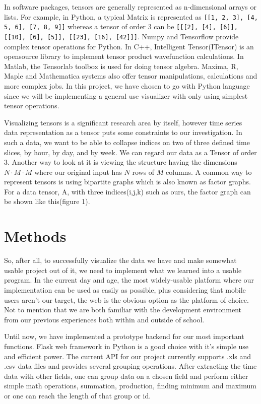 \documentclass[11pt]{article}
\begin{document}
In software packages, tensors are generally represented as n-dimensional arrays or lists. For example, in Python, a typical Matrix is represented as \texttt{[[1, 2, 3], [4, 5, 6], [7, 8, 9]]} whereas a tensor of order 3 can be \texttt{[[[2], [4], [6]], [[10], [6], [5]], [[23], [16], [42]]]}. Numpy and Tensorflow provide complex tensor operations for Python. In C++, Intelligent Tensor(ITensor) is an opensource library to implement tensor product wavefunction calculations\cite{itensor}. In Matlab, the Tensorlab toolbox is used for doing tensor algebra. Maxima, R, Maple and Mathematica systems also offer tensor manipulations, calculations and more complex jobs\cite{kolda}. In this project, we have chosen to go with Python language since we will be implementing a general use visualizer with only using simplest tensor operations.

Visualizing tensors is a significant research area by itself, however time series data representation as a tensor puts some constraints to our investigation. In such a data, we want to be able to collapse indices on two of three defined time slices, by hour, by day, and by week. We can regard our data as a Tensor of order 3. Another way to look at it is viewing the structure having the dimensions $N \cdot M \cdot M$ where our original input has $N$ rows of $M$ columns. A common way to represent tensors is using bipartite graphs which is also known as factor graphs. For a data tensor, A, with three indices(i,j,k) such as ours, the factor graph can be shown like this(figure 1).

\noindent{}

\section{Methods}

So, after all, to successfully visualize the data we have and make somewhat usable project out of it, we need to implement what we learned into a usable program. In the current day and age, the most widely-usable platform where our implementation can be used as easily as possible, plus considering that mobile users aren't our target, the web is the obvious option as the platform of choice. Not to mention that we are both familiar with the development environment from our previous experiences both within and outside of school.

Until now, we have implemented a prototype backend for our most important functions. Flask web framework in Python is a good choice with it's simple use and efficient power\cite{flask}. The current API for our project currently supports .xls and .csv data files and provides several grouping operations. After extracting the time data with other fields, one can group data on a chosen field and perform either simple math operations, summation, production, finding minimum and maximum or one can reach the length of that group or id. 
\end{document}
